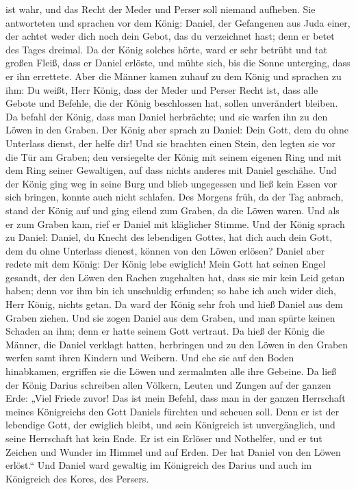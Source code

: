 ist wahr, und das Recht der Meder und Perser soll niemand aufheben.
 Sie antworteten und sprachen vor dem König: Daniel, der
Gefangenen aus Juda einer, der achtet weder dich noch dein Gebot, das du
verzeichnet hast; denn er betet des Tages dreimal.  Da
der König solches hörte, ward er sehr betrübt und tat großen Fleiß, dass
er Daniel erlöste, und mühte sich, bis die Sonne unterging, dass er ihn
errettete.  Aber die Männer kamen zuhauf zu dem König und
sprachen zu ihm: Du weißt, Herr König, dass der Meder und Perser Recht
ist, dass alle Gebote und Befehle, die der König beschlossen hat, sollen
unverändert bleiben.  Da befahl der König, dass man
Daniel herbrächte; und sie warfen ihn zu den Löwen in den Graben. Der
König aber sprach zu Daniel: Dein Gott, dem du ohne Unterlass dienst,
der helfe dir!  Und sie brachten einen Stein, den legten
sie vor die Tür am Graben; den versiegelte der König mit seinem eigenen
Ring und mit dem Ring seiner Gewaltigen, auf dass nichts anderes mit
Daniel geschähe.  Und der König ging weg in seine Burg
und blieb ungegessen und ließ kein Essen vor sich bringen, konnte auch
nicht schlafen.  Des Morgens früh, da der Tag anbrach,
stand der König auf und ging eilend zum Graben, da die Löwen waren.
 Und als er zum Graben kam, rief er Daniel mit kläglicher
Stimme. Und der König sprach zu Daniel: Daniel, du Knecht des lebendigen
Gottes, hat dich auch dein Gott, dem du ohne Unterlass dienest, können
von den Löwen erlösen?  Daniel aber redete mit dem König:
Der König lebe ewiglich!  Mein Gott hat seinen Engel
gesandt, der den Löwen den Rachen zugehalten hat, dass sie mir kein Leid
getan haben; denn vor ihm bin ich unschuldig erfunden; so habe ich auch
wider dich, Herr König, nichts getan.  Da ward der König
sehr froh und hieß Daniel aus dem Graben ziehen. Und sie zogen Daniel
aus dem Graben, und man spürte keinen Schaden an ihm; denn er hatte
seinem Gott vertraut.  Da hieß der König die Männer, die
Daniel verklagt hatten, herbringen und zu den Löwen in den Graben werfen
samt ihren Kindern und Weibern. Und ehe sie auf den Boden hinabkamen,
ergriffen sie die Löwen und zermalmten alle ihre Gebeine.
 Da ließ der König Darius schreiben allen Völkern, Leuten
und Zungen auf der ganzen Erde: „Viel Friede zuvor!  Das
ist mein Befehl, dass man in der ganzen Herrschaft meines Königreichs
den Gott Daniels fürchten und scheuen soll. Denn er ist der lebendige
Gott, der ewiglich bleibt, und sein Königreich ist unvergänglich, und
seine Herrschaft hat kein Ende.  Er ist ein Erlöser und
Nothelfer, und er tut Zeichen und Wunder im Himmel und auf Erden. Der
hat Daniel von den Löwen erlöst.``  Und Daniel ward
gewaltig im Königreich des Darius und auch im Königreich des Kores, des
Persers.

